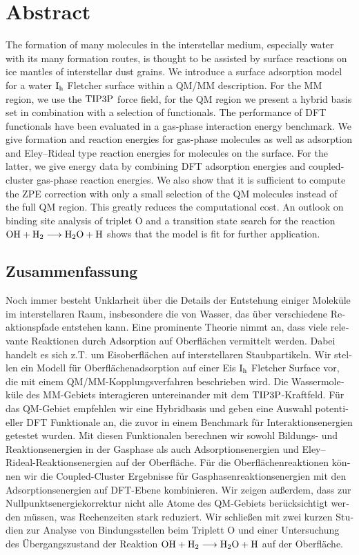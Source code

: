 \section*{Abstract}
      The formation of many molecules in the interstellar medium, especially
      water with its many formation routes, is thought to be assisted by
      surface reactions on ice mantles of interstellar dust grains. We introduce
      a surface adsorption model for a water $\text I_\text h$ Fletcher surface within a QM/MM description.
      For the MM region, we use the $\text{TIP3P}$ force field, for the QM region we
      present a hybrid basis set in combination with a selection of
      functionals. The performance of DFT functionals have been evaluated in a
      gas-phase interaction energy benchmark.
      We give formation and reaction energies for gas-phase molecules
      as well as adsorption and Eley--Rideal type reaction energies for
      molecules on the surface.
      For the latter, we give energy data by combining DFT adsorption energies
      and coupled-cluster gas-phase reaction energies. We also show that it is
      sufficient to compute the ZPE correction with only a small selection of
      the QM molecules instead of the full QM region. This greatly reduces the
      computational cost. An outlook on binding site analysis of triplet O and
      a transition state search for the reaction \mbox{$\text O \text H + \text H_2 \longrightarrow \text H _2 \text O
      + \text H$} shows that the model is fit for further application.
\begin{otherlanguage}{ngerman}
\section*{Zusammenfassung}
Noch immer besteht Unklarheit über die Details der Entstehung einiger Moleküle
im interstellaren Raum, insbesondere die von Wasser, das über verschiedene
Reaktionspfade entstehen kann. Eine prominente Theorie nimmt an, dass viele
relevante Reaktionen durch Adsorption auf Oberflächen vermittelt werden. Dabei
handelt es sich z.T. um Eisoberflächen auf interstellaren Staubpartikeln. Wir
stellen ein Modell für Oberflächenadsorption auf einer Eis $\text I_\text h$ Fletcher
Surface vor, die mit einem QM/MM-Kopplungsverfahren beschrieben wird. Die
Wassermoleküle des MM-Gebiets interagieren untereinander mit dem
$\text{TIP3P}$-Kraftfeld. Für das QM-Gebiet empfehlen wir eine Hybridbasis und geben
eine Auswahl potentieller DFT Funktionale an, die zuvor in einem Benchmark für
Interaktionsenergien getestet wurden. Mit diesen Funktionalen berechnen wir
sowohl Bildungs- und Reaktionsenergien in der Gasphase als auch
Adsorptionsenergien und Eley--Rideal-\allowbreak Reaktionsenergien auf der
Oberfläche. Für die Oberflächenreaktionen können wir die Coupled-Cluster Ergebnisse für Gasphasenreaktionsenergien mit den
Adsorptionsenergien auf DFT-Ebene kombinieren. Wir zeigen außerdem, dass zur
Nullpunktsenergiekorrektur nicht alle Atome des QM-Gebiets berücksichtigt werden
müssen, was Rechenzeiten stark reduziert. Wir schließen mit zwei kurzen Studien
zur Analyse von Bindungsstellen beim Triplett O und einer Untersuchung des
Übergangszustand der Reaktion \mbox{$\text O \text H + \text H_2 \longrightarrow \text H _2 \text O + \text H$} auf der
Oberfläche.
\end{otherlanguage}
\cleardoublepage


